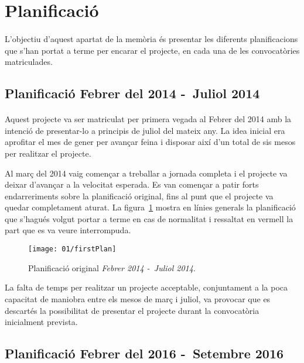 \section{Planificació}

    \paragraph{}
    L'objectiu d'aquest apartat de la memòria és presentar les diferents planificacions que s'han portat a terme per encarar el projecte, en cada una de les convocatòries matriculades.

    \subsection{Planificació Febrer del 2014 -\ Juliol 2014}

        \paragraph{}
        Aquest projecte va ser matriculat per primera vegada al Febrer del 2014 amb la intenció de presentar-lo a principis de juliol del mateix any. La idea inicial era aprofitar el mes de gener per avançar feina i disposar així d’un total de sis mesos per realitzar el projecte.

        Al març del 2014 vaig començar a treballar a jornada completa i el projecte va deixar d’avançar a la velocitat esperada. Es van començar a patir forts endarreriments sobre la planificació original, fins al punt que el projecte va quedar completament aturat. La figura~\ref{fig:firstPlan} mostra en línies generals la planificació que s’hagués volgut portar a terme en cas de normalitat i ressaltat en vermell la part que es va veure interrompuda.

        \begin{figure}[h]
                \texttt{[image: 01/firstPlan]}
                \centering
                \caption{Planificació original \emph{Febrer 2014 -\ Juliol 2014}.\label{fig:firstPlan}}
        \end{figure}

        La falta de temps per realitzar un projecte acceptable, conjuntament a la poca capacitat de maniobra entre els mesos de març i juliol, va provocar que es descartés la possibilitat de presentar el projecte durant la convocatòria inicialment prevista.

    \subsection{Planificació Febrer del 2016 -\ Setembre 2016}\label{sec:thePlan}

